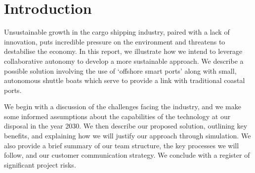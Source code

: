     \section{Introduction}
    Unsustainable growth in the cargo shipping industry, paired with a lack of innovation, puts incredible pressure on the environment and threatens to destabilise the economy. In this report, we illustrate how we intend to leverage collaborative autonomy to develop a more sustainable approach. We describe a possible solution involving the use of `offshore smart ports' along with small, autonomous shuttle boats  which serve to provide a link with traditional coastal ports. 
    
    We begin with a discussion of the challenges facing the industry, and we make some informed assumptions about the capabilities of the technology at our disposal in the year 2030. We then describe our proposed solution, outlining key benefits, and explaining how we will justify our approach through simulation. We also provide a brief summary of our team structure, the key processes we will follow, and our customer communication strategy. We conclude with a register of significant project risks.